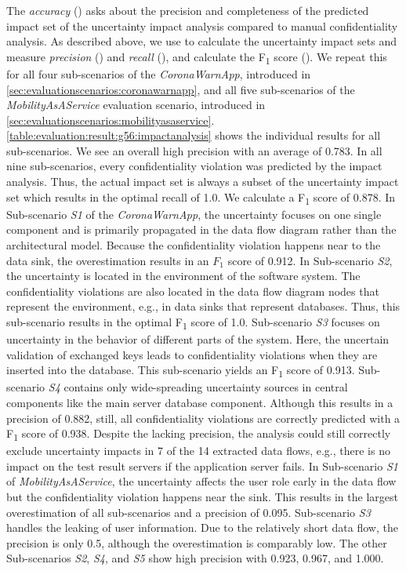 The \emph{accuracy} () asks about the precision and completeness of the predicted impact set of the uncertainty impact analysis compared to manual confidentiality analysis.
As described above, we use \uia to calculate the uncertainty impact sets and measure \emph{precision} () and \emph{recall} (), and calculate the F\textsubscript{1} score ().
We repeat this for all four sub-scenarios of the \emph{CoronaWarnApp}, introduced in \autoref{sec:evaluationscenarios:coronawarnapp}, and all five sub-scenarios of the \emph{MobilityAsAService} evaluation scenario, introduced in \autoref{sec:evaluationscenarios:mobilityasaservice}.
\autoref{table:evaluation:result:g56:impactanalysis} shows the individual results for all sub-scenarios.
We see an overall high precision with an average of 0.783.
In all nine sub-scenarios, every confidentiality violation was predicted by the impact analysis.
Thus, the actual impact set is always a subset of the uncertainty impact set which results in the optimal recall of 1.0.
We calculate a F\textsubscript{1} score of 0.878.
In Sub-scenario \emph{S1} of the \emph{CoronaWarnApp}, the uncertainty focuses on one single component and is primarily propagated in the data flow diagram rather than the architectural model.
Because the confidentiality violation happens near to the data sink, the overestimation results in an $F_{1}$ score of 0.912.
In Sub-scenario \emph{S2}, the uncertainty is located in the environment of the software system.
The confidentiality violations are also located in the data flow diagram nodes that represent the environment, e.g., in data sinks that represent databases.
Thus, this sub-scenario results in the optimal F\textsubscript{1} score of 1.0.
Sub-scenario \emph{S3} focuses on uncertainty in the behavior of different parts of the system.
Here, the uncertain validation of exchanged keys leads to confidentiality violations when they are inserted into the database.
This sub-scenario yields an F\textsubscript{1} score of 0.913.
Sub-scenario \emph{S4} contains only wide-spreading uncertainty sources in central components like the main server database component.
Although this results in a precision of 0.882, still, all confidentiality violations are correctly predicted with a F\textsubscript{1} score of 0.938.
Despite the lacking precision, the analysis could still correctly exclude uncertainty impacts in 7 of the 14 extracted data flows, e.g., there is no impact on the test result servers if the application server fails.
In Sub-scenario \emph{S1} of \emph{MobilityAsAService}, the uncertainty affects the user role early in the data flow but the confidentiality violation happens near the sink.
This results in the largest overestimation of all sub-scenarios and a precision of 0.095.
Sub-scenario \emph{S3} handles the leaking of user information.
Due to the relatively short data flow, the precision is only 0.5, although the overestimation is comparably low.
The other Sub-scenarios \emph{S2}, \emph{S4}, and \emph{S5} show high precision with 0.923, 0.967, and 1.000.

